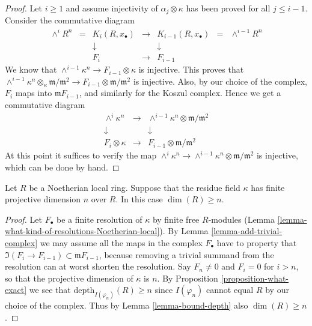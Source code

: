\begin{proof}
\medskip\noindent
Let $i \geq 1$ and assume injectivity of $\alpha_j \otimes \kappa$ has been
proved for all $j \leq i - 1$. Consider the commutative diagram
$$
\begin{matrix}
\wedge^i R^n & = & K_i(R, x_{\bullet}) & \to & K_{i-1}(R, x_{\bullet})
& = & \wedge^{i-1} R^n \\
& & \downarrow & & \downarrow & & \\
& & F_i & \to & F_{i-1} & &
\end{matrix}
$$
We know that $\wedge^{i-1} \kappa^n \to F_{i-1} \otimes \kappa$
is injective. This proves that
$\wedge^{i-1} \kappa^n \otimes_{\kappa} \mathfrak m/\mathfrak m^2
\to F_{i-1} \otimes \mathfrak m/\mathfrak m^2$ is injective.
Also, by our choice of the complex, $F_i$ maps into
$\mathfrak mF_{i-1}$, and similarly for the Koszul complex.
Hence we get a commutative diagram
$$
\begin{matrix}
\wedge^i \kappa^n & \to &
\wedge^{i-1} \kappa^n \otimes \mathfrak m/\mathfrak m^2 \\
\downarrow & & \downarrow \\
F_i \otimes \kappa & \to & F_{i-1} \otimes \mathfrak m/\mathfrak m^2
\end{matrix}
$$
At this point it suffices to verify the map
$\wedge^i \kappa^n \to
\wedge^{i-1} \kappa^n \otimes \mathfrak m/\mathfrak m^2$
is injective, which can be done by hand.
\end{proof}

\begin{lemma}
\label{lemma-dim-gl-dim}
Let $R$ be a Noetherian local ring.
Suppose that the residue field $\kappa$ has finite
projective dimension $n$ over $R$.
In this case $\dim(R) \geq n$.
\end{lemma}

\begin{proof}
Let $F_{\bullet}$ be a finite resolution of $\kappa$ by finite free
$R$-modules (Lemma \ref{lemma-what-kind-of-resolutions-Noetherian-local}).
By Lemma \ref{lemma-add-trivial-complex}
we may assume all the maps in the complex $F_{\bullet}$
have to property that $\Im(F_i \to F_{i-1})
\subset \mathfrak m F_{i-1}$, because removing a trivial
summand from the resolution can at worst shorten the resolution.
Say $F_n \not = 0$ and $F_i = 0$ for $i > n$, so that
the projective dimension of $\kappa$ is $n$.
By Proposition \ref{proposition-what-exact} we see that
$\text{depth}_{I(\varphi_n)}(R) \geq n$ since $I(\varphi_n)$
cannot equal $R$ by our choice of the complex.
Thus by Lemma \ref{lemma-bound-depth} also $\dim(R) \geq n$.
\end{proof}

